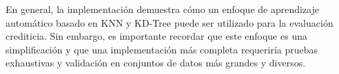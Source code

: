 \documentclass{article}
\begin{document}
\begin{sloppypar}
\begin{enumerate}
\end{enumerate}
En general, la implementación demuestra cómo un enfoque de aprendizaje automático basado en KNN y KD-Tree puede ser utilizado para la evaluación crediticia. Sin embargo, es importante recordar que este enfoque es una simplificación y que una implementación más completa requeriría pruebas exhaustivas y validación en conjuntos de datos más grandes y diversos.



\clearpage


\end{sloppypar}
\end{document}
